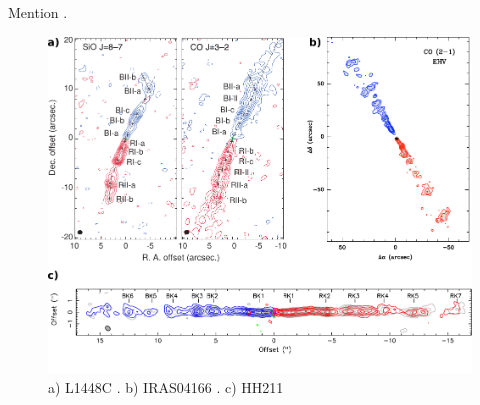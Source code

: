 \documentclass[12pt]{mythesis}
\begin{document}
Mention \citet{ray2023}.
% 

\begin{figure}
	\begin{center}
		\includegraphics[width=\textwidth]{figures/molecularjets.pdf}
\caption[Molecular jets]{a) L1448C \citep{hirano2010}. b) IRAS04166 \citep{santiago-garcia2009}. c) HH211 \citep{lee2010, moraghan2016}}
	\end{center}
\end{figure}
\end{document}
